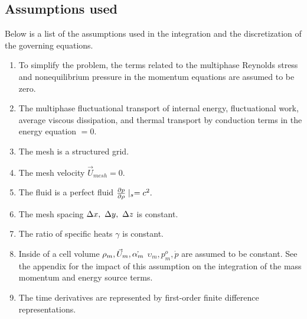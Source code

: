 \documentclass[fleqn]{article}
\begin{document}
\subsection{\textsf{Assumptions used}}
Below is a list of the assumptions used in the integration and the
discretization of the governing equations.
%
\sffamily
\begin{enumerate}
\item To simplify the problem, the terms related to the multiphase Reynolds stress and  nonequilibrium pressure in the momentum equations are assumed to be zero.
\item The multiphase fluctuational transport of internal energy, fluctuational work, average viscous dissipation, and thermal transport by conduction terms in the energy equation $ = 0.$
\item The mesh is a structured grid.
\item The mesh velocity $\vec{U}_{mesh} = 0$.
\item The fluid is a perfect fluid $\pd{p}{\rho}\mid_s = c^2.$
\item The mesh spacing $\delx,~\dely,~\delz$ is constant.
\item The ratio of specific heats $\gamma$ is constant.
\item Inside of a cell volume $\rhom, \um, \dot{\alpham}$
$\upsilon_m, p^o_m, \dot{p}$ are assumed to be constant.  See the appendix for the impact of this assumption on the integration of the mass momentum and energy source terms.
\item The time derivatives are represented by first-order finite difference representations.
\end{enumerate}
\normalfont
%
\end{document}
